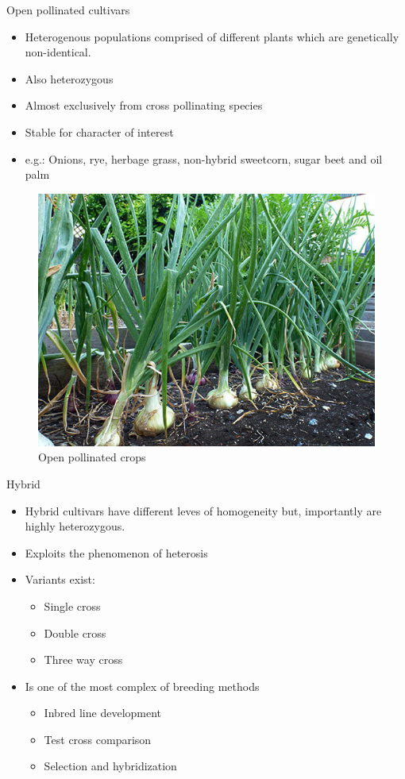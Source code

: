 \documentclass[11pt,ignorenonframetext,aspectratio=169]{beamer}
\providecommand{\tightlist}{%
  \setlength{\itemsep}{0pt}\setlength{\parskip}{0pt}}
\begin{document}
\begin{frame}{Open pollinated cultivars}
\protect\hypertarget{open-pollinated-cultivars}{}
\begin{itemize}
\tightlist
\item
  Heterogenous populations comprised of different plants which are
  genetically non-identical.
\item
  Also heterozygous
\item
  Almost exclusively from cross pollinating species
\item
  Stable for character of interest
\item
  e.g.: Onions, rye, herbage grass, non-hybrid sweetcorn, sugar beet and
  oil palm
\end{itemize}

\begin{figure}

{\centering \includegraphics[width=0.35\linewidth]{./images/open_pollinated_onion} 

}

\caption{Open pollinated crops}\label{fig:op-onion}
\end{figure}
\end{frame}

\begin{frame}{Hybrid}
\protect\hypertarget{hybrid}{}
\begin{itemize}
\tightlist
\item
  Hybrid cultivars have different leves of homogeneity but, importantly
  are highly heterozygous.
\item
  Exploits the phenomenon of heterosis
\item
  Variants exist:

  \begin{itemize}
  \tightlist
  \item
    Single cross
  \item
    Double cross
  \item
    Three way cross
  \end{itemize}
\item
  Is one of the most complex of breeding methods

  \begin{itemize}
  \tightlist
  \item
    Inbred line development
  \item
    Test cross comparison
  \item
    Selection and hybridization
  \end{itemize}
\end{itemize}
\end{frame}
\end{document}
